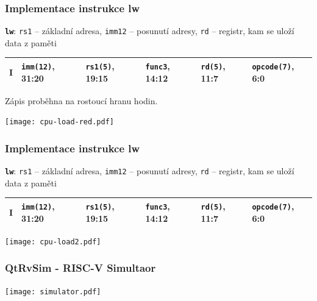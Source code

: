 \documentclass{beamer}
\begin{document}
\begin{frame}[shrink=15]
\frametitle{Implementace instrukce lw}

\textbf{\texttt{lw}}: \texttt{rs1} -- základní adresa, \texttt{imm12} -- posunutí adresy, \texttt{rd} -- registr, kam se uloží data z paměti

\bigskip

\begin{tabular}{|l|l|l|l|l|l|}\hline
I & \textbf{\texttt{imm(12)}}, 31:20 & \textbf{\texttt{rs1(5)}}, 19:15 & \textbf{\texttt{func3}}, 14:12 & \textbf{\texttt{rd(5)}}, 11:7 & \textbf{\texttt{opcode(7)}}, 6:0 \\ \hline
\end{tabular}

Zápis proběhna na rostoucí hranu hodin.

\begin{center}
\texttt{[image: cpu-load-red.pdf]}
\end{center}



\end{frame}


\begin{frame}[shrink=15]
\frametitle{Implementace instrukce lw}

\textbf{\texttt{lw}}: \texttt{rs1} -- základní adresa, \texttt{imm12} -- posunutí adresy, \texttt{rd} -- registr, kam se uloží data z paměti

\bigskip

\begin{tabular}{|l|l|l|l|l|l|}\hline
I & \textbf{\texttt{imm(12)}}, 31:20 & \textbf{\texttt{rs1(5)}}, 19:15 & \textbf{\texttt{func3}}, 14:12 & \textbf{\texttt{rd(5)}}, 11:7 & \textbf{\texttt{opcode(7)}}, 6:0 \\ \hline
\end{tabular}

\bigskip

\begin{center}
\texttt{[image: cpu-load2.pdf]}
\end{center}
\end{frame}


\begin{frame}
\frametitle{QtRvSim - RISC-V Simultaor}

\texttt{[image: simulator.pdf]}

\end{frame}
\end{document}
